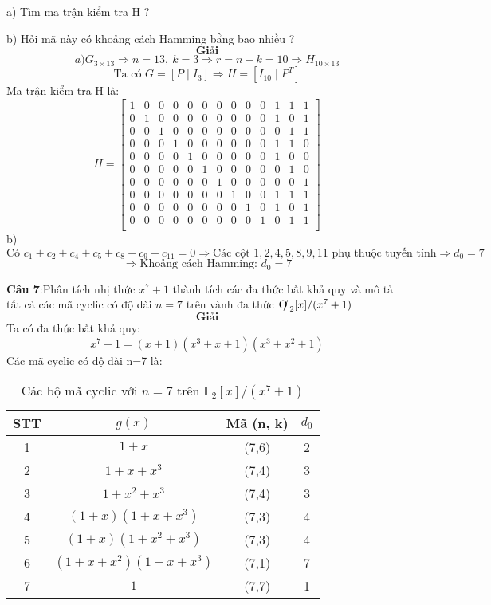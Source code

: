 \documentclass[12pt]{article}
\begin{document}
a) Tìm ma trận kiểm tra H ?

b) Hỏi mã này có khoảng cách Hamming bằng bao nhiều ?
\[
\textbf{Giải}
\]
\[
a) G _{3\times 13} \Rightarrow n = 13,\ k = 3 \Rightarrow r = n - k = 10
\Rightarrow H _{10 \times 13}
\]
\[
\text{Ta có } G = [P \mid I_3] \Rightarrow H = [I_{10} \mid P^T]
\]
Ma trận kiểm tra H là:
\[
H = \left[
\begin{array}{cccccccccc|ccc}
1 & 0 & 0 & 0 & 0 & 0 & 0 & 0 & 0 & 0 & 1 & 1 & 1 \\
0 & 1 & 0 & 0 & 0 & 0 & 0 & 0 & 0 & 0 & 1 & 0 & 1 \\
0 & 0 & 1 & 0 & 0 & 0 & 0 & 0 & 0 & 0 & 0 & 1 & 1 \\
0 & 0 & 0 & 1 & 0 & 0 & 0 & 0 & 0 & 0 & 1 & 1 & 0 \\
0 & 0 & 0 & 0 & 1 & 0 & 0 & 0 & 0 & 0 & 1 & 0 & 0 \\
0 & 0 & 0 & 0 & 0 & 1 & 0 & 0 & 0 & 0 & 0 & 1 & 0 \\
0 & 0 & 0 & 0 & 0 & 0 & 1 & 0 & 0 & 0 & 0 & 0 & 1 \\
0 & 0 & 0 & 0 & 0 & 0 & 0 & 1 & 0 & 0 & 1 & 1 & 1 \\
0 & 0 & 0 & 0 & 0 & 0 & 0 & 0 & 1 & 0 & 1 & 0 & 1 \\
0 & 0 & 0 & 0 & 0 & 0 & 0 & 0 & 0 & 1 & 0 & 1 & 1 \\
\end{array}
\right]
\]
b)
\[
\text{Có } c_1 + c_2 + c_4 + c_5 + c_8 + c_9 + c_{11} = 0 
\Rightarrow \text{Các cột } 1, 2, 4, 5, 8, 9, 11 \text{ phụ thuộc tuyến tính} 
\Rightarrow d_0 = 7
\]
\[
\Rightarrow
\text{Khoảng cách Hamming: $d_0=7$}
\]

\newpage
\textbf{Câu 7}:Phân tích nhị thức $x^7 + 1$  thành tích các đa thức bất khả quy và mô tả tất cả các mã cyclic có độ dài  $n = 7$ trên vành đa thức  $\text{O\kern-0.4em/\kern0.1em}_2[x]/(x^7 + 1)$
\[
\textbf{Giải}
\]
Ta có đa thức bất khả quy:
\[
x^7 + 1 = (x + 1)(x^3 + x + 1)(x^3 + x^2 + 1)
\]
Các mã cyclic có độ dài n=7 là:
\begin{table}[h!]
\centering
\begin{tabular}{|c|c|c|c|}
\hline
\textbf{STT} & \boldmath$g(x)$ & \textbf{Mã (n, k)} & \boldmath$d_0$ \\
\hline
1 & $1 + x$ & (7,6) & 2 \\
2 & $1 + x + x^3$ & (7,4) & 3 \\
3 & $1 + x^2 + x^3$ & (7,4) & 3 \\
4 & $(1 + x)(1 + x + x^3)$ & (7,3) & 4 \\
5 & $(1 + x)(1 + x^2 + x^3)$ & (7,3) & 4 \\
6 & $(1 + x + x^2)(1 + x + x^3)$ & (7,1) & 7 \\
7 & $1$ & (7,7) & 1 \\
\hline
\end{tabular}
\caption{Các bộ mã cyclic với $n = 7$ trên $\mathbb{F}_2[x]/(x^7 + 1)$}
\end{table}
\end{document}

